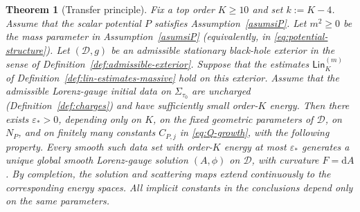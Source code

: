 \documentclass[11pt]{article}
\numberwithin{equation}{section}
\theoremstyle{plain}
\newtheorem{theorem}{Theorem}[section]
\theoremstyle{definition}
\theoremstyle{remark}
\newcommand{\dd}{\mathrm{d}}
\newcommand{\Lin}{\mathsf{Lin}}
\begin{document}
\medskip

\begin{theorem}[Transfer principle]\label{thm:method}
Fix a top order $K\ge10$ and set $k:=K-4$. Assume that the scalar potential $P$ satisfies Assumption~\ref{asumsiP}.
Let $m^{2}\ge 0$ be the mass parameter in Assumption~\ref{asumsiP} (equivalently, in \eqref{eq:potential-structure}).
Let $(\mathcal D,g)$ be an admissible stationary black-hole exterior in the sense of Definition~\ref{def:admissible-exterior}.
Suppose that the estimates $\Lin_{K}^{(m)}$ of Definition~\ref{def:lin-estimates-massive} hold on this exterior.
Assume that the admissible Lorenz-gauge initial data on $\Sigma_{\tau_{0}}$ are \emph{uncharged} (Definition~\ref{def:charges}) and have sufficiently small order-$K$ energy.
Then there exists $\varepsilon_{*}>0$, depending only on $K$, on the fixed geometric parameters of $\mathcal D$, on $N_{P}$, and on finitely many constants $C_{P,j}$ in \eqref{eq:Q-growth}, with the following property.
Every smooth such data set with order-$K$ energy at most $\varepsilon_{*}$ generates a unique global smooth Lorenz-gauge solution $(A,\phi)$ on $\mathcal D$, with curvature $F=\dd A$.
By completion, the solution and scattering maps extend continuously to the corresponding energy spaces.
All implicit constants in the conclusions depend only on the same parameters.


\end{theorem}
\end{document}
